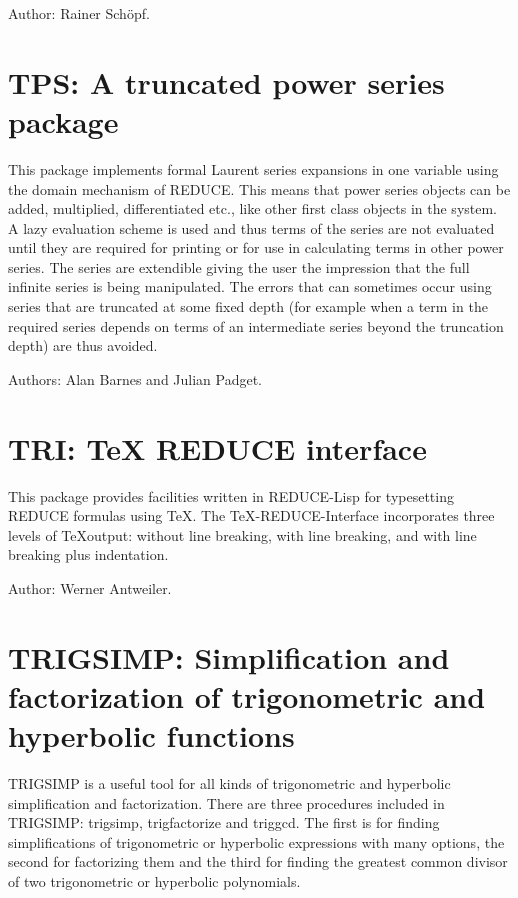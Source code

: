 Author: Rainer Sch\"opf.



\section{TPS: A truncated power series package}  

This package implements formal Laurent series expansions in one variable
using the domain mechanism of REDUCE.  This means that power series
objects can be added, multiplied, differentiated etc.,  like other first
class objects in the system.  A lazy evaluation scheme is used and thus
terms of the series are not evaluated until they are required for printing
or for use in calculating terms in other power series.  The series are
extendible giving the user the impression that the full infinite series is
being manipulated.  The errors that can sometimes occur using series that
are truncated at some fixed depth (for example when a term in the required
series depends on terms of an intermediate series beyond the truncation
depth) are thus avoided.

Authors:  Alan Barnes and Julian Padget.

\section{TRI: TeX REDUCE interface} 

This package provides facilities written in REDUCE-Lisp for typesetting
REDUCE formulas using \TeX.  The \TeX-REDUCE-Interface incorporates three
levels of \TeX output: without line breaking, with line breaking, and
with line breaking plus indentation.

Author: Werner Antweiler.

\section{TRIGSIMP: Simplification and factorization of trigonometric
and hyperbolic functions} 
\label{TRIGSIMP}

TRIGSIMP is a useful tool for all kinds of trigonometric and hyperbolic
simplification and factorization.  There are three procedures included in
TRIGSIMP: trigsimp, trigfactorize and triggcd.  The first is for finding
simplifications of trigonometric or hyperbolic expressions with many
options, the second for factorizing them and the third for finding the
greatest common divisor of two trigonometric or hyperbolic polynomials.

